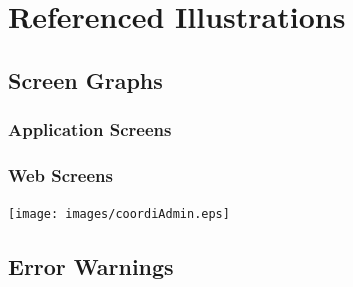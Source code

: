 \chapter{Referenced Illustrations}
\label{chap:appendix}


\section{Screen Graphs}
\label{sec:ScreenGraph}

\subsection{Application Screens}

\subsection{Web Screens}
\texttt{[image: images/coordiAdmin.eps]}

\section{Error Warnings}
\label{sec:ErrorWarnings}

